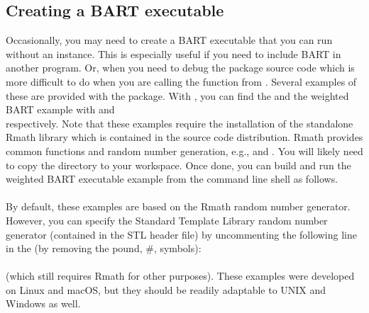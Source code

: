 \documentclass[article]{jss}
\begin{document}
\subsection{Creating a BART executable}

Occasionally, you may need to create a BART executable that you can
run without an  instance.  This is especially useful if
you need to include BART in another  program.  Or, when
you need to debug the  package  source code
which is more difficult to do when you are calling the function from
.  Several examples of these are provided with the
 package.  With , you can find the
 and the weighted BART example with
 and\\
 respectively.
Note that these examples require the installation of the standalone
Rmath library \citep{RCor17} which is contained in the 
source code distribution.  Rmath provides common 
functions and random number generation, e.g.,  and
.  You will likely need to copy the 
directory to your workspace.  Once done, you can build and run the
weighted BART executable example from the command line shell as
follows.\\
\\
By default, these examples are based on the Rmath random number
generator.  However, you can specify the  Standard
Template Library random number generator (contained in the STL
 header file) by uncommenting the following line in
the  (by removing the pound, \#, symbols):\\
\\
(which still requires Rmath for other purposes).  These examples were
developed on Linux and macOS, but they should be readily adaptable to
UNIX and Windows as well.

\pagebreak


\end{document}

